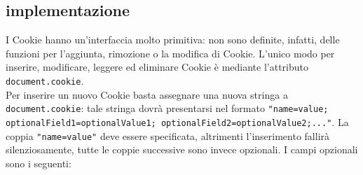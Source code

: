 \documentclass[a4paper, 12pt, twoside, openright]{book}
\begin{document}
\subsection{implementazione}
I Cookie hanno un'interfaccia molto primitiva: non sono definite, infatti, delle funzioni per l'aggiunta, rimozione o la modifica di Cookie. L'unico modo per inserire, modificare, leggere ed eliminare Cookie è mediante l'attributo \texttt{document.cookie}\cite{MDN_Web_docs:cookies}.\\
Per inserire un nuovo Cookie basta assegnare una nuova stringa a \linebreak\texttt{document.cookie}\cite{MDN_Web_docs:cookies}: tale stringa dovrà presentarsi nel formato \linebreak\texttt{"name=value; optionalField1=optionalValue1; optionalField2=\linebreak optionalValue2;..."}\cite{MDN_Web_docs:cookies}. La coppia \texttt{"name=value"} deve essere specificata, altrimenti l'inserimento fallirà silenziosamente, tutte le coppie successive sono invece opzionali. I campi opzionali sono i seguenti:
\end{document}
